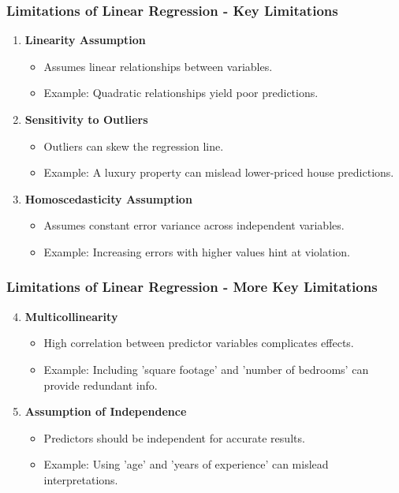 \documentclass[aspectratio=169]{beamer}
\begin{document}
\begin{frame}[fragile]
    \frametitle{Limitations of Linear Regression - Key Limitations}
    \begin{enumerate}
        \item \textbf{Linearity Assumption}
            \begin{itemize}
                \item Assumes linear relationships between variables.
                \item Example: Quadratic relationships yield poor predictions.
            \end{itemize}
        
        \item \textbf{Sensitivity to Outliers}
            \begin{itemize}
                \item Outliers can skew the regression line.
                \item Example: A luxury property can mislead lower-priced house predictions.
            \end{itemize}

        \item \textbf{Homoscedasticity Assumption}
            \begin{itemize}
                \item Assumes constant error variance across independent variables.
                \item Example: Increasing errors with higher values hint at violation.
            \end{itemize}
    \end{enumerate}
\end{frame}

\begin{frame}[fragile]
    \frametitle{Limitations of Linear Regression - More Key Limitations}
    \begin{enumerate}
        \setcounter{enumi}{3} %
        \item \textbf{Multicollinearity}
            \begin{itemize}
                \item High correlation between predictor variables complicates effects.
                \item Example: Including 'square footage' and 'number of bedrooms' can provide redundant info.
            \end{itemize}
        
        \item \textbf{Assumption of Independence}
            \begin{itemize}
                \item Predictors should be independent for accurate results.
                \item Example: Using 'age' and 'years of experience' can mislead interpretations.
            \end{itemize}
    \end{enumerate}
\end{frame}
\end{document}
